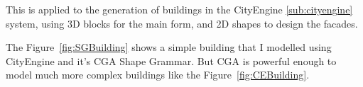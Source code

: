 This is applied to the generation of buildings in the CityEngine \ref{sub:cityengine} system, using 3D blocks for the main form, and 2D shapes to design the facades.


The Figure~\ref{fig:SGBuilding} shows a simple building that I modelled using CityEngine and it's CGA Shape Grammar. But CGA is powerful enough to model much more complex buildings like the Figure~\ref{fig:CEBuilding}.



